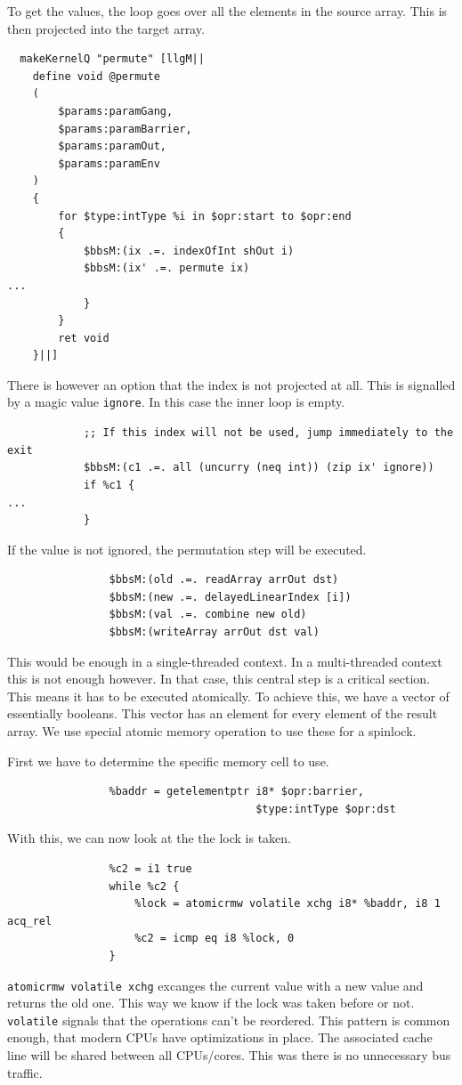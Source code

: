 \documentclass[a4paper,bibliography=totocnumbered,parskip,headsepline]{scrbook}
\begin{document}
To get the values, the loop goes over all the elements in the source array.
This is then projected into the target array.
\begin{lstlisting}
  makeKernelQ "permute" [llgM||
    define void @permute
    (
        $params:paramGang,
        $params:paramBarrier,
        $params:paramOut,
        $params:paramEnv
    )
    {
        for $type:intType %i in $opr:start to $opr:end
        {
            $bbsM:(ix .=. indexOfInt shOut i)
            $bbsM:(ix' .=. permute ix)
...
            }
        }
        ret void
    }||]
\end{lstlisting}
There is however an option that the index is not projected at all.
This is signalled by a magic value \lstinline[language=haskell]!ignore!.
In this case the inner loop is empty.
\begin{lstlisting}
            ;; If this index will not be used, jump immediately to the exit
            $bbsM:(c1 .=. all (uncurry (neq int)) (zip ix' ignore))
            if %c1 {
...
            }
\end{lstlisting}
If the value is not ignored, the permutation step will be executed.
\begin{lstlisting}
                $bbsM:(old .=. readArray arrOut dst)
                $bbsM:(new .=. delayedLinearIndex [i])
                $bbsM:(val .=. combine new old)
                $bbsM:(writeArray arrOut dst val)
\end{lstlisting}
This would be enough in a single-threaded context.
In a multi-threaded context this is not enough however.
In that case, this central step is a critical section.
This means it has to be executed atomically.
To achieve this, we have a vector of essentially booleans.
This vector has an element for every element of the result array.
We use special atomic memory operation to use these for a spinlock.

First we have to determine the specific memory cell to use.
\begin{lstlisting}
                %baddr = getelementptr i8* $opr:barrier,
                                       $type:intType $opr:dst
\end{lstlisting}
With this, we can now look at the the lock is taken.
\begin{lstlisting}
                %c2 = i1 true
                while %c2 {
                    %lock = atomicrmw volatile xchg i8* %baddr, i8 1 acq_rel
                    %c2 = icmp eq i8 %lock, 0
                }
\end{lstlisting}
\lstinline!atomicrmw volatile xchg! excanges the current value with a new value and returns the old one.
This way we know if the lock was taken before or not.
\lstinline!volatile! signals that the operations can't be reordered.
This pattern is common enough, that modern CPUs have optimizations in place.
The associated cache line will be shared between all CPUs/cores.
This was there is no unnecessary bus traffic.
\end{document}
